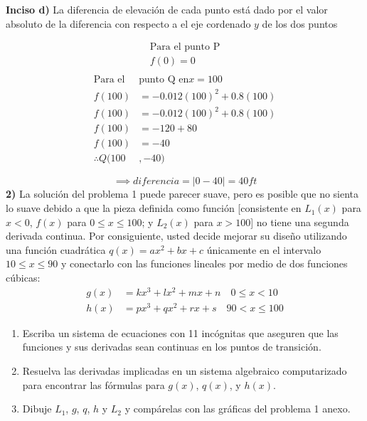 \textbf{Inciso d)} La diferencia de elevación de cada punto está dado por el valor absoluto de la diferencia con respecto a el eje cordenado $y$ de los dos puntos

\begin{multicols}{2}
	\noindent
	\begin{align*}
		\text{Para el punto P} \\
		f(0)=0                 \\
	\end{align*}
	\columnbreak
	\begin{align*}
		\text{Para el }  & \text{punto Q en}  x = 100 \\
		f(100)           & =-0.012(100)^2+0.8(100)    \\
		f(100)           & =-0.012(100)^2+0.8(100)    \\
		f(100)           & =-120+80                   \\
		f(100)           & =-40                       \\
		\therefore Q(100 & ,-40)
	\end{align*}
\end{multicols}

$$\implies diferencia = |0-40|=40ft$$
\newpage
\textbf{2)} La solución del problema 1 puede parecer suave, pero es posible que no sienta lo suave debido a que la pieza definida como función [consistente en $L_1(x)$ para $x < 0$, $f (x)$ para $0 \leq x \leq 100$; y $L_2(x)$ para $x > 100$] no tiene una segunda derivada continua. Por consiguiente, usted decide mejorar su diseño utilizando una función cuadrática $q(x) = ax^2 + bx + c$ únicamente en el intervalo $10 \leq x \leq 90$ y conectarlo con las funciones lineales por medio de dos funciones cúbicas:
\begin{align*}
	g(x) & = kx^3 + lx^2 + mx + n \quad 0 \leq x < 10   \\
	h(x) & = px^3 + qx^2 + rx + s \quad 90 < x \leq 100
\end{align*}

\begin{enumerate}[label=\alph*)]
	\item Escriba un sistema de ecuaciones con 11 incógnitas que aseguren que las funciones y sus derivadas sean continuas en los puntos de transición.

	\item Resuelva las derivadas implicadas en un sistema algebraico computarizado para encontrar las fórmulas para \( g(x) \), \( q(x) \), y \( h(x) \).

	\item Dibuje $L_1$, $g$, $q$, $h$ y $L_2$ y compárelas con las gráficas del problema 1 anexo.
\end{enumerate}

